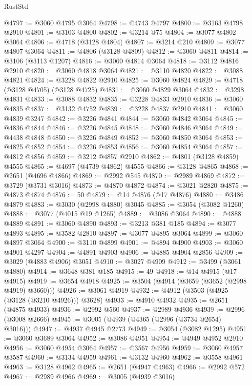 \begin{lexlean}{RustStd}
\begin{coremodule}
@4797 := @3060 @4795 @3064
@4798 := @4743 @4797
@4800 := @3163 @4798 @2910
@4801 := @3103 @4800
@4802 := @3214 @75
@4804 := @3077 @4802 @3064
@4806 := @4718 (@3128 @4804)
@4807 := @3214 @210
@4809 := @3077 @4807 @3064
@4811 := @4806 (@3128 @4809)
@4812 := @3060 @4811
@4814 := @3106 (@3113 @1207)
@4816 := @3060 @4814 @3064
@4818 := @3112 @4816 @2910
@4820 := @3060 @4818 @3064
@4821 := @3110 @4820
@4822 := @3088 @4821
@4824 := @3228 @4822 @2910
@4825 := @3060 @4824
@4829 := @4718 (@3128 @4705) (@3128 @4725)
@4831 := @3060 @4829 @3064
@4832 := @3298 @4831
@4833 := @3088 @4832
@4835 := @3228 @4833 @2910
@4836 := @3060 @4835
@4837 := @3132 @4752
@4839 := @3228 @4837 @2910
@4841 := @3060 @4839 @3247
@4842 := @3226 @4841
@4844 := @3060 @4842 @3064
@4845 := @4836 @4844
@4846 := @3226 @4845
@4848 := @3060 @4846 @3064
@4849 := @4438 @4848
@4850 := @3226 @4849
@4852 := @3060 @4850 @3064
@4853 := @4825 @4852
@4854 := @3226 @4853
@4856 := @3060 @4854 @3064
@4857 := @4812 @4856
@4859 := @3212 @4857 @2910
@4862 := @4801 (@3128 @4859) @4555
@4865 := @4697 (@4739 @4862) @4555
@4866 := @3128 @4865
@4868 := @2651 (@4696 @4866)
@4869 := @2992 @545
@4870 := @2989 @4869
@4872 := @3729 (@3731 @3016)
@4873 := @4870 @4872
@4874 := @3021 @2820
@4875 := @4873 @4874
@4876 := 50
@4879 := @14 @4876 (@17 @4876)
@4880 := @3486 @4879
@4883 := @3030 (@2998 @4880) @3045
@4885 := @3054 (@3082 @1260)
@4888 := @3077 (@4015 @19 @1265)
@4889 := @3086 @3064
@4890 := @4888 @4889
@4891 := @3060 @4890
@4893 := @3213 @381 @185
@4894 := @3077 @4893
@4895 := @3582 @2810
@4897 := @3077 @4895 @3064
@4899 := @3060 @4897 @3064
@4900 := @3110 @4899
@4901 := @4894 @4900
@4903 := @3060 @4901 @4297
@4904 := @4891 @4903
@4906 := @4885 @4904 @2856
@4909 := @3029 (@4883 @4906) @3051
@4910 := @3027 @4909
@4912 := @3499 (@3061 @4880)
@4914 := @3648 @381 @185
@4915 := 49
@4918 := @14 @4915 (@17 @4915)
@4919 := @3654 @4918
@4925 := @3504 (@4914 (@3659 (@3652 (@2998 @4919) @3660)))
@4926 := @3061 @4919
@4932 := @4912 (@3503 (@4925 (@3128 (@3210 @4926))) @3628)
@4933 := @4910 @4932
@4935 := @2651 (@4875 @4933)
@4936 := @2992 @560
@4937 := @2989 @4936
@4939 := @2996 (@3008 @2666)
@4945 := @3005 (@4939 (@4365 (@2996 (@3734 @2654) @3016)))
@4947 := @4937 @4945 @2773
@4949 := @3054 (@3082 @1295)
@4951 := @3060 @3689 @3064
@4952 := @3086 @4951
@4954 := @4949 @4952 @2910
@4956 := @3060 @4954 @3064
@4957 := @3567 @4956
@4959 := @3060 @4957 @3587
@4960 := @3134 @4959
@4961 := @3132 @4960
@4962 := @3558 @4961
@4963 := @3128 @4962
@4965 := @2651 (@4947 @4963)
@4966 := @2992 @572
@4967 := @2989 @4966
@4969 := @3005 (@4939 @3016)

\end{coremodule}
\end{lexlean}
